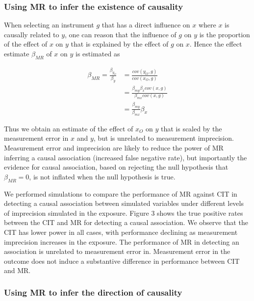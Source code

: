 \documentclass[]{article}
\begin{document}
\subsubsection{Using MR to infer the existence of
causality}\label{using-mr-to-infer-the-existence-of-causality}

When selecting an instrument \(g\) that has a direct influence on \(x\)
where \(x\) is causally related to \(y\), one can reason that the
influence of \(g\) on \(y\) is the proportion of the effect of \(x\) on
\(y\) that is explained by the effect of \(g\) on \(x\). Hence the
effect estimate \(\beta_{MR}\) of \(x\) on \(y\) is estimated as

\[
\begin{aligned}
\beta_{MR} = \frac{\beta_{y_O}}{\beta_g} & = \frac{cov(y_O, g)}{cov(x_O, g)} \\
                                         & = \frac{\beta_{my} \beta_x cov(x, g)} {\beta_{mx} cov(x, g)} \\
                                         & = \frac{\beta_{my}} {\beta_{mx}} \beta_x
\end{aligned}
\]

Thus we obtain an estimate of the effect of \(x_O\) on \(y\) that is
scaled by the measurement error in \(x\) and \(y\), but is unrelated to
measurement imprecision. Measurement error and imprecision are likely to
reduce the power of MR inferring a causal association (increased false
negative rate), but importantly the evidence for causal association,
based on rejecting the null hypothesis that \(\beta_{MR} = 0\), is not
inflated when the null hypothesis is true.

We performed simulations to compare the performance of MR against CIT in
detecting a causal association between simulated variables under
different levels of imprecision simulated in the exposure. Figure 3
shows the true positive rates between the CIT and MR for detecting a
causal association. We observe that the CIT has lower power in all
cases, with performance declining as measurement imprecision increases
in the exposure. The performance of MR in detecting an association is
unrelated to measurement error in. Measurement error in the outcome does
not induce a substantive difference in performance between CIT and MR.

\subsubsection{Using MR to infer the direction of
causality}\label{using-mr-to-infer-the-direction-of-causality}
\end{document}
